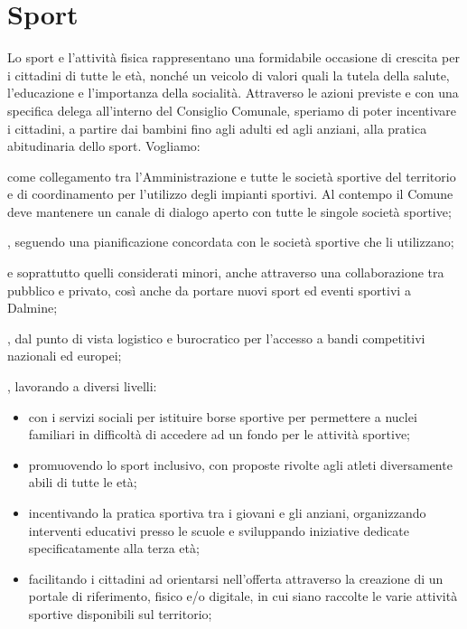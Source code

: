 \section{Sport}
Lo sport e l'attività fisica rappresentano una formidabile occasione di crescita per i cittadini di tutte le età, nonché un veicolo di valori quali la tutela della salute, l'educazione e l'importanza della socialità. Attraverso le azioni previste e con una specifica delega all'interno del Consiglio Comunale, speriamo di poter incentivare i cittadini, a partire dai bambini fino agli adulti ed agli anziani, alla pratica abitudinaria dello sport. Vogliamo:

 come collegamento tra l'Amministrazione e tutte le società sportive del territorio e di coordinamento per l'utilizzo degli impianti sportivi. Al contempo il Comune deve mantenere un canale di dialogo aperto con tutte le singole società sportive;

, seguendo una pianificazione concordata con le società sportive che li utilizzano;

 e soprattutto quelli considerati minori, anche attraverso una collaborazione tra pubblico e privato, così anche da portare nuovi sport ed eventi sportivi a Dalmine;

, dal punto di vista logistico e burocratico per l'accesso a bandi competitivi nazionali ed europei;

\begin{bluebox}
, lavorando a diversi livelli:
\begin{itemize}
  \item con i servizi sociali per istituire borse sportive per permettere a nuclei familiari in difficoltà di accedere ad un fondo per le attività sportive;
  \item promuovendo lo sport inclusivo, con proposte rivolte agli atleti diversamente abili di tutte le età;
  \item incentivando la pratica sportiva tra i giovani e gli anziani, organizzando interventi educativi presso le scuole e sviluppando iniziative dedicate specificatamente alla terza età;
  \item facilitando i cittadini ad orientarsi nell'offerta attraverso la creazione di un portale di riferimento, fisico e/o digitale, in cui siano raccolte le varie attività sportive disponibili sul territorio;
\end{itemize}
\end{bluebox}

